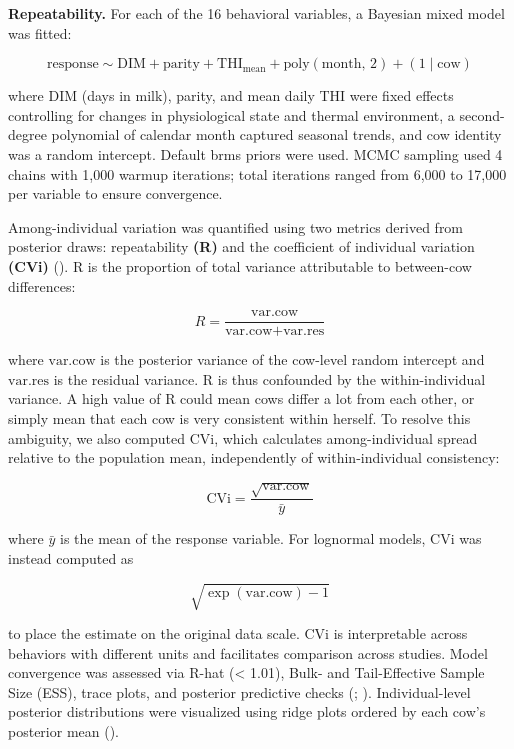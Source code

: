 \documentclass[
]{article}
\begin{document}
\textbf{Repeatability.} For each of the 16 behavioral variables, a
Bayesian mixed model was fitted:

\[
\text{response} \sim \text{DIM} + \text{parity} + \text{THI}_{\text{mean}} + \text{poly}(\text{month},\, 2) + (1 \mid \text{cow})
\]

where DIM (days in milk), parity, and mean daily THI were fixed effects
controlling for changes in physiological state and thermal environment,
a second-degree polynomial of calendar month captured seasonal trends,
and cow identity was a random intercept. Default brms priors were used.
MCMC sampling used 4 chains with 1,000 warmup iterations; total
iterations ranged from 6,000 to 17,000 per variable to ensure
convergence.

Among-individual variation was quantified using two metrics derived from
posterior draws: repeatability \textbf{(R)} and the coefficient of
individual variation \textbf{(CVi)} (). R is the proportion of total variance attributable to
between-cow differences:

\[
R = \frac{\text{var.cow}}{\text{var.cow} + \text{var.res}}
\]

where \(\text{var.cow}\) is the posterior variance of the cow-level
random intercept and \(\text{var.res}\) is the residual variance. R is
thus confounded by the within-individual variance. A high value of R
could mean cows differ a lot from each other, or simply mean that each
cow is very consistent within herself. To resolve this ambiguity, we
also computed CVi, which calculates among-individual spread relative to
the population mean, independently of within-individual consistency:

\[
\text{CVi} = \frac{\sqrt{\text{var.cow}}}{\bar{y}}
\]

where \(\bar{y}\) is the mean of the response variable. For lognormal
models, CVi was instead computed as

\[
\sqrt{\exp(\text{var.cow}) - 1}
\]

to place the estimate on the original data scale. CVi is interpretable
across behaviors with different units and facilitates comparison across
studies. Model convergence was assessed via R-hat (\textless{} 1.01),
Bulk- and Tail-Effective Sample Size (ESS), trace plots, and posterior
predictive checks (; ).
Individual-level posterior distributions were visualized using ridge
plots ordered by each cow's posterior mean
().
\end{document}
